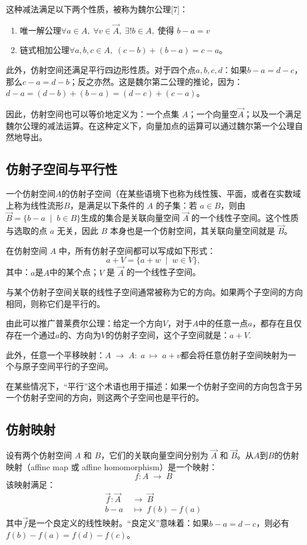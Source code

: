 这种减法满足以下两个性质，被称为魏尔公理[7]：
\begin{enumerate}
\item 唯一解公理$\forall a \in A, \;\forall v \in \overrightarrow{A}, \;\exists! b \in A, \;\text{使得 } b - a = v$
\item 链式相加公理$\forall a, b, c \in A, \;(c - b) + (b - a) = c - a$。
\end{enumerate}
此外，仿射空间还满足平行四边形性质。对于四个点$a, b, c, d$：如果$b - a = d - c$，那么$c - a = d - b$；反之亦然。这是魏尔第二公理的推论，因为：$
d - a = (d - b) + (b - a) = (d - c) + (c - a)$。

因此，仿射空间也可以等价地定义为：一个点集 $A$；一个向量空$\overrightarrow{A}$；以及一个满足魏尔公理的减法运算。在这种定义下，向量加点的运算可以通过魏尔第一个公理自然地导出。
\subsection{仿射子空间与平行性}
一个仿射空间$A$的仿射子空间（在某些语境下也称为线性簇、平面，或者在实数域上称为线性流形$B$，是满足以下条件的 $A$ 的子集：若 $a \in B$，则由
$\overrightarrow{B} = \{ b - a \;\mid\; b \in B \}$生成的集合是关联向量空间 $\overrightarrow{A}$ 的一个线性子空间。这个性质与选取的点 $a$ 无关，因此 $B$ 本身也是一个仿射空间，其关联向量空间就是 $\overrightarrow{B}$。

在仿射空间 $A$ 中，所有仿射子空间都可以写成如下形式：
$$
a + V = \{ a + w \;\mid\; w \in V \},~
$$
其中：$a$是$A$中的某个点；$V$ 是 $\overrightarrow{A}$ 的一个线性子空间。

与某个仿射子空间关联的线性子空间通常被称为它的方向。如果两个子空间的方向相同，则称它们是平行的。

由此可以推广普莱费尔公理：给定一个方向$V$，对于$A$中的任意一点$a$，都存在且仅存在一个通过$a$的、方向为$V$的仿射子空间，这个子空间就是：$a + V$.

此外，任意一个平移映射：$A \;\to\; A :\; a \;\mapsto\; a + v$都会将任意仿射子空间映射为一个与原子空间平行的子空间。

在某些情况下，“平行”这个术语也用于描述：如果一个仿射子空间的方向包含于另一个仿射子空间的方向，则这两个子空间也是平行的。
\subsection{仿射映射}
设有两个仿射空间 $A$ 和 $B$，它们的关联向量空间分别为 $\overrightarrow{A}$ 和 $\overrightarrow{B}$。从$A$到$B$的仿射映射（affine map 或 affine homomorphism）是一个映射：
$$
f: A \;\longrightarrow\; B~
$$
该映射满足：
$$
\begin{aligned}
\overrightarrow{f}: \overrightarrow{A} &\;\longrightarrow\; \overrightarrow{B} \\
b - a &\;\longmapsto\; f(b) - f(a)
\end{aligned}~
$$
其中$\overrightarrow{f}$是一个良定义的线性映射。“良定义”意味着：如果$b - a = d - c$，则必有 $f(b) - f(a) = f(d) - f(c)$。

